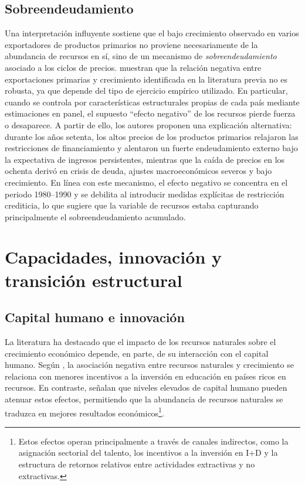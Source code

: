 \documentclass[../../PTFM.tex]{subfiles}
\begin{document}
	\subsection{Sobreendeudamiento}
	\label{subsec:sobreendeudamiento}
	
	Una interpretación influyente sostiene que el bajo crecimiento observado en varios exportadores de productos primarios no proviene necesariamente de la abundancia de recursos en sí, sino de un mecanismo de \textit{sobreendeudamiento} asociado a los ciclos de precios. \textcite{Manzano2001} muestran que la relación negativa entre exportaciones primarias y crecimiento identificada en la literatura previa no es robusta, ya que depende del tipo de ejercicio empírico utilizado. En particular, cuando se controla por características estructurales propias de cada país mediante estimaciones en panel, el supuesto “efecto negativo” de los recursos pierde fuerza o desaparece. A partir de ello, los autores proponen una explicación alternativa: durante los años setenta, los altos precios de los productos primarios relajaron las restricciones de financiamiento y alentaron un fuerte endeudamiento externo bajo la expectativa de ingresos persistentes, mientras que la caída de precios en los ochenta derivó en crisis de deuda, ajustes macroeconómicos severos y bajo crecimiento. En línea con este mecanismo, el efecto negativo se concentra en el periodo 1980--1990 y se debilita al introducir medidas explícitas de restricción crediticia, lo que sugiere que la variable de recursos estaba capturando principalmente el sobreendeudamiento acumulado.
	
	\section{Capacidades, innovación y transición estructural}
	\label{sec:capacidades-innovacion}
	
	\subsection{Capital humano e innovación}
	\label{subsec:capital-humano-innovacion}
	
	La literatura ha destacado que el impacto de los recursos naturales sobre el crecimiento económico depende, en parte, de su interacción con el capital humano. Según \textcite{Gylfason2001}, la asociación negativa entre recursos naturales y crecimiento se relaciona con menores incentivos a la inversión en educación en países ricos en recursos. En contraste, \textcite{Bravo-Ortega2005} señalan que niveles elevados de capital humano pueden atenuar estos efectos, permitiendo que la abundancia de recursos naturales se traduzca en mejores resultados económicos\footnote{Estos efectos operan principalmente a través de canales indirectos, como la asignación sectorial del talento, los incentivos a la inversión en I+D y la estructura de retornos relativos entre actividades extractivas y no extractivas.}.
	
\end{document}
